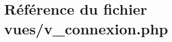 \hypertarget{v__connexion_8php}{}\section{Référence du fichier vues/v\+\_\+connexion.php}
\label{v__connexion_8php}

